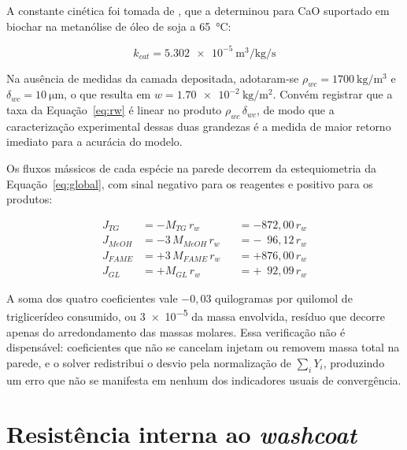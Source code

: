 A constante cinética foi tomada de \textcite{Melo2023}, que a determinou para
CaO suportado em biochar na metanólise de óleo de soja a \SI{65}{\celsius}:

\begin{equation}
k_{cat} = \SI{5.302e-5}{\meter\cubed\per\kilogram\per\second}
\end{equation}

Na ausência de medidas da camada depositada, adotaram-se
$\rho_{wc} = \SI{1700}{\kilogram\per\meter\cubed}$ e
$\delta_{wc} = \SI{10}{\micro\meter}$, o que resulta em
$w = \SI{1.70e-2}{\kilogram\per\meter\squared}$. Convém registrar que a taxa da
Equação~\eqref{eq:rw} é linear no produto $\rho_{wc}\,\delta_{wc}$, de modo que
a caracterização experimental dessas duas grandezas é a medida de maior retorno
imediato para a acurácia do modelo.


Os fluxos mássicos de cada espécie na parede decorrem da estequiometria da
Equação~\eqref{eq:global}, com sinal negativo para os reagentes e positivo para
os produtos:

\begin{align}
J_{TG}   &= -M_{TG}\, r_w        &&= -872{,}00\, r_w \label{eq:fluxTG}\\
J_{MeOH} &= -3\,M_{MeOH}\, r_w   &&= -\phantom{0}96{,}12\, r_w \label{eq:fluxMeOH}\\
J_{FAME} &= +3\,M_{FAME}\, r_w   &&= +876{,}00\, r_w \label{eq:fluxFAME}\\
J_{GL}   &= +M_{GL}\, r_w        &&= +\phantom{0}92{,}09\, r_w \label{eq:fluxGL}
\end{align}

A soma dos quatro coeficientes vale $-0{,}03$ quilogramas por quilomol de
triglicerídeo consumido, ou \num{3e-5} da massa envolvida, resíduo que decorre
apenas do arredondamento das massas molares. Essa verificação não é
dispensável: coeficientes que não se cancelam injetam ou removem massa total na
parede, e o solver redistribui o desvio pela normalização de $\sum_i Y_i$,
produzindo um erro que não se manifesta em nenhum dos indicadores usuais de
convergência.

\section{Resistência interna ao \textit{washcoat}}

